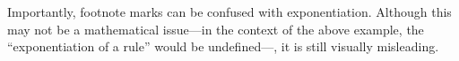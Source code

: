 




\noindent Importantly, footnote marks can be confused with exponentiation.
Although this may not be a mathematical issue---in the context of the above example, the ``exponentiation of a rule'' would be undefined---, it is still visually misleading.

